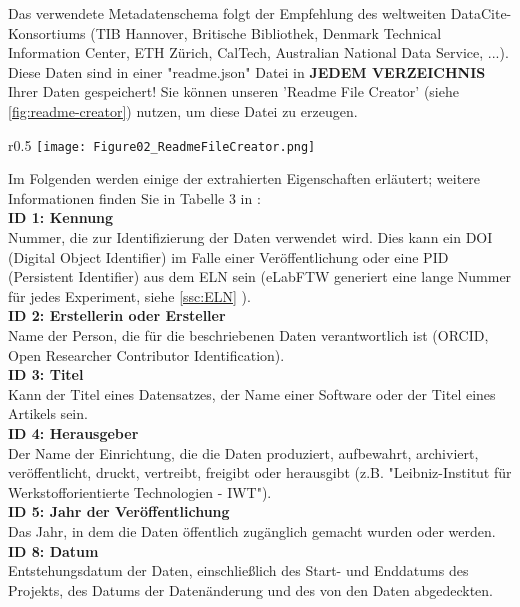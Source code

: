 Das verwendete Metadatenschema folgt der Empfehlung des weltweiten DataCite-Konsortiums (TIB Hannover, Britische Bibliothek, Denmark Technical Information Center, ETH Zürich, CalTech, Australian National Data Service, ...).
Diese Daten sind in einer "readme.json" Datei in \textbf{JEDEM VERZEICHNIS} Ihrer Daten gespeichert! Sie können unseren 'Readme File Creator' (siehe \ref{fig:readme-creator}) nutzen, um diese Datei zu erzeugen. \\
\begin{wrapfigure}{r}{0.5\linewidth}
  \vspace{-1em}
  \texttt{[image: Figure02\_ReadmeFileCreator.png]}
  \caption{Data Input Tool: Readme-File-Creator}
  \label{fig:readme-creator}
\end{wrapfigure}
Im Folgenden werden einige der extrahierten Eigenschaften erläutert; weitere
Informationen finden Sie in Tabelle 3 in \cite{datacite2019}: \\[6pt]
%
\textbf{ID 1: Kennung} \\
Nummer, die zur Identifizierung der Daten verwendet wird. Dies kann ein DOI
(Digital Object Identifier) im Falle einer Veröffentlichung oder eine PID
(Persistent Identifier) aus dem ELN sein (eLabFTW  generiert eine lange Nummer
für jedes Experiment, siehe \ref{ssc:ELN} ). \\[6pt]
%
\textbf{ID 2: Erstellerin oder Ersteller} \\
Name der Person, die für die beschriebenen Daten verantwortlich ist (ORCID, Open Researcher Contributor Identification). \\[6pt]
%
\textbf{ID 3: Titel} \\
Kann der Titel eines Datensatzes, der Name einer Software oder der Titel eines
Artikels sein. \\[6pt]
%
\textbf{ID 4: Herausgeber} \\
Der Name der Einrichtung, die die Daten produziert, aufbewahrt, archiviert,
veröffentlicht, druckt, vertreibt, freigibt oder herausgibt (z.B.
"Leibniz-Institut für Werkstofforientierte Technologien - IWT"). \\[6pt]
%
\textbf{ID 5: Jahr der Veröffentlichung} \\
Das Jahr, in dem die Daten öffentlich zugänglich gemacht wurden oder werden. \\[6pt]
%
\textbf{ID 8: Datum} \\
Entstehungsdatum der Daten, einschließlich des Start- und Enddatums des
Projekts, des Datums der Datenänderung und des von den Daten abgedeckten. \\[6pt]
